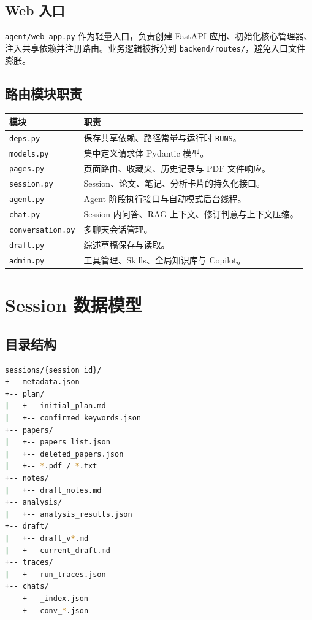 \documentclass[12pt,a4paper,onecolumn]{ctexart}
\begin{document}
\subsection{Web 入口}
\texttt{agent/web\_app.py} 作为轻量入口，负责创建 FastAPI 应用、初始化核心管理器、注入共享依赖并注册路由。业务逻辑被拆分到 \texttt{backend/routes/}，避免入口文件膨胀。

\subsection{路由模块职责}
\begin{longtable}{p{3.6cm}p{9.8cm}}
\toprule
\textbf{模块} & \textbf{职责} \\
\midrule
\texttt{deps.py} & 保存共享依赖、路径常量与运行时 \texttt{RUNS}。\\
\texttt{models.py} & 集中定义请求体 Pydantic 模型。\\
\texttt{pages.py} & 页面路由、收藏夹、历史记录与 PDF 文件响应。\\
\texttt{session.py} & Session、论文、笔记、分析卡片的持久化接口。\\
\texttt{agent.py} & Agent 阶段执行接口与自动模式后台线程。\\
\texttt{chat.py} & Session 内问答、RAG 上下文、修订判意与上下文压缩。\\
\texttt{conversation.py} & 多聊天会话管理。\\
\texttt{draft.py} & 综述草稿保存与读取。\\
\texttt{admin.py} & 工具管理、Skills、全局知识库与 Copilot。\\
\bottomrule
\end{longtable}

\section{Session 数据模型}

\subsection{目录结构}
\begin{lstlisting}[language=bash]
sessions/{session_id}/
+-- metadata.json
+-- plan/
|   +-- initial_plan.md
|   +-- confirmed_keywords.json
+-- papers/
|   +-- papers_list.json
|   +-- deleted_papers.json
|   +-- *.pdf / *.txt
+-- notes/
|   +-- draft_notes.md
+-- analysis/
|   +-- analysis_results.json
+-- draft/
|   +-- draft_v*.md
|   +-- current_draft.md
+-- traces/
|   +-- run_traces.json
+-- chats/
    +-- _index.json
    +-- conv_*.json
\end{lstlisting}
\end{document}
